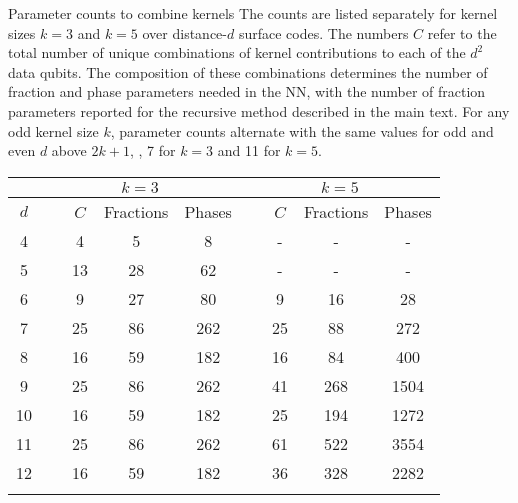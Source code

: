 \begin{table}[htbp]
\centering
\ccaption
{Parameter counts to combine kernels}
{The counts are listed separately for kernel sizes $k=3$ and $k=5$ over distance-$d$ surface codes. The numbers $C$ refer to the total number of unique combinations of kernel contributions to each of the $d^2$ data qubits. The composition of these combinations determines the number of fraction and phase parameters needed in the NN, with the number of fraction parameters reported for the recursive method described in the main text. For any odd kernel size $k$, parameter counts alternate with the same values for odd and even $d$ above $2k+1$, \ie, 7 for $k=3$ and 11 for $k=5$.}
\renewcommand{\arraystretch}{1.25}
\begin{tabular}{c ccc ccc}
\hline
      & \multicolumn{3}{c}{$k=3$} & \multicolumn{3}{c}{$k=5$} \\
\hline
$d$ & ~~~$C$ & Fractions & Phases & ~~~$C$ & Fractions & Phases  \\
\hline
4 & ~~~4 & 5 & 8 & ~~~- & - & - \\
5 & ~~~13 & 28 & 62 & ~~~- & - & - \\
6 & ~~~9 & 27 & 80 & ~~~9 & 16 & 28 \\
7 & ~~~25 & 86 & 262 & ~~~25 & 88 & 272 \\
8 & ~~~16 & 59 & 182 & ~~~16 & 84 & 400 \\
9 & ~~~25 & 86 & 262 & ~~~41 & 268 & 1504 \\
10 & ~~~16 & 59 & 182 & ~~~25 & 194 & 1272 \\
11 & ~~~25 & 86 & 262 & ~~~61 & 522 & 3554 \\
12 & ~~~16 & 59 & 182 & ~~~36 & 328 & 2282 \\
\hline
\label{table:unique-kern-contribs}
\end{tabular}
\end{table}



